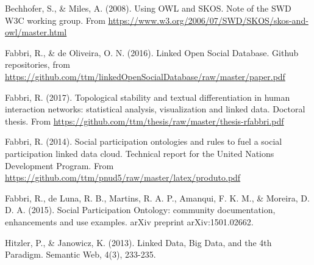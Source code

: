 \documentclass[12pt,fleqn]{article}
\begin{document}
\begin{thebibliography}{99}
\fontsize{11}{0}\selectfont
{}
	Bechhofer, S., \& Miles, A. (2008). Using OWL and SKOS. Note of the SWD W3C working group.
From \url{https://www.w3.org/2006/07/SWD/SKOS/skos-and-owl/master.html}

	Fabbri, R., \& de Oliveira, O. N. (2016). Linked Open Social Database. Github repositories, from \url{https://github.com/ttm/linkedOpenSocialDatabase/raw/master/paper.pdf}

Fabbri, R. (2017). Topological stability and textual differentiation in human interaction networks:
		statistical analysis, visualization and linked data. Doctoral thesis.
		From \url{https://github.com/ttm/thesis/raw/master/thesis-rfabbri.pdf}

Fabbri, R. (2014). Social participation ontologies and rules to fuel a social participation linked data cloud.
	Technical report for the United Nations Development Program.
		From \url{https://github.com/ttm/pnud5/raw/master/latex/produto.pdf}

Fabbri, R., de Luna, R. B., Martins, R. A. P., Amanqui, F. K. M., \& Moreira, D. D. A. (2015). Social Participation Ontology: community documentation, enhancements and use examples. arXiv preprint arXiv:1501.02662.

Hitzler, P., \& Janowicz, K. (2013). Linked Data, Big Data, and the 4th Paradigm. Semantic Web, 4(3), 233-235.

\end{thebibliography}





\end{document}
